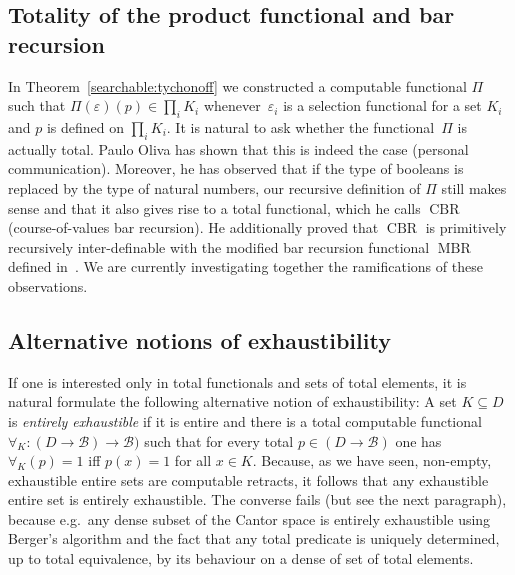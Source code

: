 \documentclass{LMCS}
\newcommand{\e}{\varepsilon}
\newcommand{\pBool}{\mathcal{B}}
\newcommand{\True}{1}\newcommand{\False}{0}\newcommand{\domain}[1]{{\D_{#1}}}
\newcommand{\D}{D}
\begin{document}
\subsection{Totality of the product functional and bar recursion}

\newcommand{\CBR}{\operatorname{CBR}}
\newcommand{\MBR}{\operatorname{MBR}} In
Theorem~\ref{searchable:tychonoff} we constructed a computable
functional $\Pi$ such that $\Pi(\e)(p) \in \prod_i K_i$
whenever~$\e_i$ is a selection functional for a set $K_i$ and $p$ is
defined on $\prod_i K_i$. It is natural to ask whether the
functional~$\Pi$ is actually total. Paulo Oliva has shown that this is
indeed the case (personal communication). Moreover, he has observed
that if the type of booleans is replaced by the type of natural
numbers, our recursive definition of $\Pi$ still makes sense and that
it also gives rise to a total functional, which he calls $\CBR$
(course-of-values bar recursion). He additionally proved that $\CBR$
is primitively recursively inter-definable with the modified bar
recursion functional $\MBR$ defined in~\cite{berger:oliva:mbr}. We are
currently investigating together the ramifications of these
observations.

\subsection{Alternative notions of exhaustibility}

If one is interested only in total functionals and sets of total
elements, it is natural formulate the following alternative notion of
exhaustibility: A set $K \subseteq D$ is \emph{entirely exhaustible}
if it is entire and there is a total computable functional $\forall_K
\colon (D \to \pBool) \to \pBool)$ such that for every total $p \in (D
\to \pBool)$ one has $\forall_K(p)=\True$ iff $p(x)=\True$ for all $x
\in K$. Because, as we have seen, non-empty, exhaustible entire sets
are computable retracts, it follows that any exhaustible entire set is
entirely exhaustible. The converse fails (but see the next paragraph),
because e.g.\ any dense subset of the Cantor space is entirely
exhaustible using Berger's algorithm and the fact that any total
predicate is uniquely determined, up to total equivalence, by its
behaviour on a dense of set of total elements.
\end{document}
